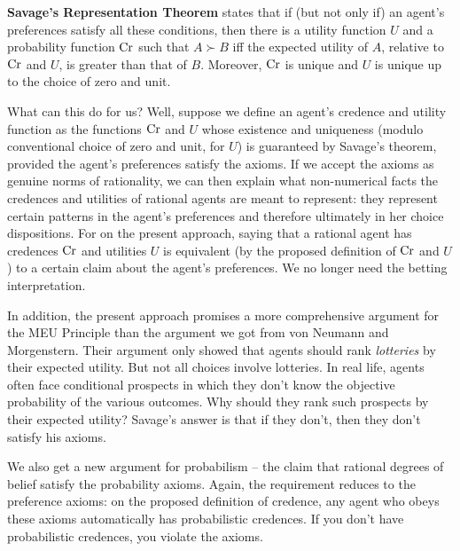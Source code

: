   
\textbf{Savage's Representation Theorem} states that if (but not only
if) an agent's preferences satisfy all these conditions, then there is
a utility function $U$ and a probability function $\text{Cr}$ such that $A
\succ B$ iff the expected utility of $A$, relative to $\text{Cr}$ and $U$,
is greater than that of $B$. Moreover, $\text{Cr}$ is unique and $U$ is
unique up to the choice of zero and unit.

What can this do for us? Well, suppose we define an agent's credence
and utility function as the functions $\text{Cr}$ and $U$ whose existence
and uniqueness (modulo conventional choice of zero and unit, for $U$)
is guaranteed by Savage's theorem, provided the agent's preferences
satisfy the axioms. If we accept the axioms as genuine norms of
rationality, we can then explain what non-numerical facts the
credences and utilities of rational agents are meant to represent:
they represent certain patterns in the agent's preferences and
therefore ultimately in her choice dispositions. For on the present
approach, saying that a rational agent has credences $\text{Cr}$ and
utilities $U$ is equivalent (by the proposed definition of $\text{Cr}$ and
$U$) to a certain claim about the agent's preferences. We no longer
need the betting interpretation.

In addition, the present approach promises a more comprehensive
argument for the MEU Principle than the argument we got from von
Neumann and Morgenstern. Their argument only showed that agents should
rank \emph{lotteries} by their expected utility. But not all choices
involve lotteries. In real life, agents often face conditional
prospects in which they don't know the objective probability of the
various outcomes. Why should they rank such prospects by their
expected utility? Savage's answer is that if they don't, then they
don't satisfy his axioms.

We also get a new argument for probabilism -- the claim that rational
degrees of belief satisfy the probability axioms. Again, the
requirement reduces to the preference axioms: on the proposed
definition of credence, any agent who obeys these axioms automatically
has probabilistic credences. If you don't have probabilistic
credences, you violate the axioms.

